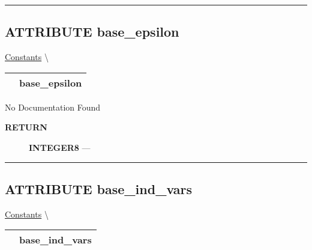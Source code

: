 \rule{\linewidth}{0.5pt}
\subsection*{\textsf{\colorbox{headtoc}{\color{white} ATTRIBUTE}
base\_epsilon}}

\hypertarget{ecldoc:constants.base_epsilon}{}
\hspace{0pt} \hyperlink{ecldoc:Constants}{Constants} \textbackslash 

{\renewcommand{\arraystretch}{1.5}
\begin{tabularx}{\textwidth}{|>{\raggedright\arraybackslash}l|X|}
\hline
\hspace{0pt}\mytexttt{\color{red} } & \textbf{base\_epsilon} \\
\hline
\end{tabularx}
}

\par





No Documentation Found








\par
\begin{description}
\item [\colorbox{tagtype}{\color{white} \textbf{\textsf{RETURN}}}] \textbf{INTEGER8} --- 
\end{description}




\rule{\linewidth}{0.5pt}
\subsection*{\textsf{\colorbox{headtoc}{\color{white} ATTRIBUTE}
base\_ind\_vars}}

\hypertarget{ecldoc:constants.base_ind_vars}{}
\hspace{0pt} \hyperlink{ecldoc:Constants}{Constants} \textbackslash 

{\renewcommand{\arraystretch}{1.5}
\begin{tabularx}{\textwidth}{|>{\raggedright\arraybackslash}l|X|}
\hline
\hspace{0pt}\mytexttt{\color{red} } & \textbf{base\_ind\_vars} \\
\hline
\end{tabularx}
}

\par





